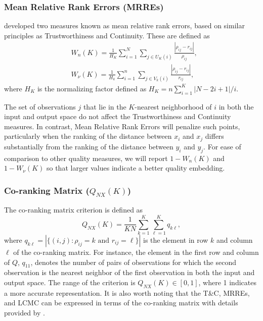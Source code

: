 \documentclass[11pt,a4paper,]{article}
\begin{document}
\hypertarget{mean-relative-rank-errors-mrres}{%
\subsubsection*{Mean Relative Rank Errors (MRREs)}\label{mean-relative-rank-errors-mrres}}

\textcite{Lee2008-dy} developed two measures known as mean relative rank errors, based on similar principles as Trustworthiness and Continuity. These are defined as
\begin{equation}\label{eq:MRREs}
\begin{aligned}
  & W_{n}(K)=\frac{1}{H_{K}} \sum_{i=1}^{N} \sum_{j \in U_{K}(i)} \frac{|\rho_{ij}-r_{ij}|}{\rho_{ij}}, \\
  & W_{\nu}(K)=\frac{1}{H_{k}} \sum_{i=1}^{n} \sum_{j \in V_{k}(i)} \frac{|\rho_{ij}-r_{ij}|}{r_{ij}},
\end{aligned}
\end{equation}
where \(H_K\) is the normalizing factor defined as
\(H_{K}=n \sum_{i=1}^{K} {|N-2 i+1|} / {i}.\)

The set of observations \(j\) that lie in the \(K\)-nearest neighborhood of \(i\) in both the input and output space do not affect the Trustworthiness and Continuity measures. In contrast, Mean Relative Rank Errors will penalize such points, particularly when the ranking of the distance between \(x_i\) and \(x_j\) differs substantially from the ranking of the distance between \(y_i\) and \(y_j\). For ease of comparison to other quality measures, we will report \(1-W_{n}(K)\) and \(1-W_{\nu}(K)\) so that larger values indicate a better quality embedding.

\hypertarget{co-ranking-matrix-q_nxk}{%
\subsubsection*{\texorpdfstring{Co-ranking Matrix (\(Q_{NX}(K)\))}{Co-ranking Matrix (Q\_\{NX\}(K))}}\label{co-ranking-matrix-q_nxk}}

The co-ranking matrix criterion is defined as
\begin{equation}\label{eq:Q_NX}
  Q_{NX}(K)=\frac{1}{K N} \sum_{k=1}^{K} \sum_{\ell=1}^{K} q_{k\ell},
\end{equation}
where
\(q_{k\ell}=|\{(i, j): \rho_{i j}=k \text { and } r_{i j}=\ell\}|\)
is the element in row \(k\) and column \(\ell\) of the co-ranking matrix.
For instance, the element in the first row and column of \(Q\), \(q_{11}\), denotes the number of pairs of observations for which the second observation is the nearest neighbor of the first observation in both the input and output space. The range of the criterion is \(Q_{N X}(K) \in[0,1]\), where 1 indicates a more accurate representation. It is also worth noting that the T\&C, MRREs, and LCMC can be expressed in terms of the co-ranking matrix with details provided by \textcite{Lee2008-dy}.
\end{document}

